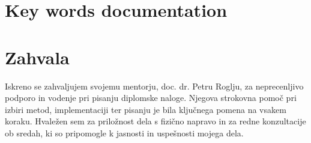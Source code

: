 \documentclass[12pt,a4paper,titlepage,openany]{report}
\begin{document}
\section*{Key words documentation}

\medskip

\begin{center}
\end{center}





\newpage
\section*{Zahvala}
Iskreno se zahvaljujem svojemu mentorju, doc. dr. Petru Roglju, za neprecenljivo podporo in vodenje pri pisanju diplomske naloge. Njegova strokovna pomoč pri izbiri metod, implementaciji ter pisanju je bila ključnega pomena na vsakem koraku. Hvaležen sem za priložnost dela s fizično napravo in za redne konzultacije ob sredah, ki so pripomogle k jasnosti in uspešnosti mojega dela.
\end{document}
